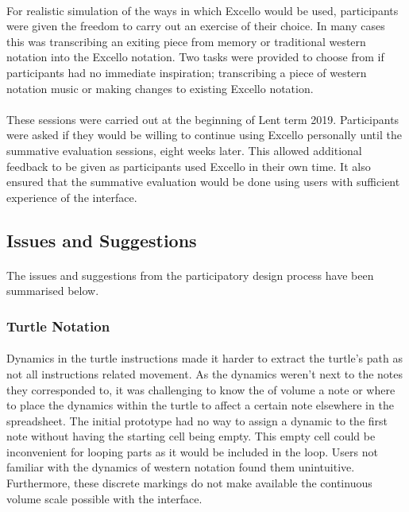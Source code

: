 \paragraph{} For realistic simulation of the ways in which Excello would be used, participants were given the freedom to carry out an exercise of their choice. In many cases this was transcribing an exiting piece from memory or traditional western notation into the Excello notation. Two tasks were provided to choose from if participants had no immediate inspiration; transcribing a piece of western notation music or making changes to existing Excello notation.

\paragraph{} These sessions were carried out at the beginning of Lent term 2019. Participants were asked if they would be willing to continue using Excello personally until the summative evaluation sessions, eight weeks later. This allowed additional feedback to be given as participants used Excello in their own time. It also ensured that the summative evaluation would be done using users with sufficient experience of the interface.

\subsection{Issues and Suggestions}

\paragraph{} The issues and suggestions from the participatory design process have been summarised below.

\subsubsection{Turtle Notation}

\paragraph{} Dynamics in the turtle instructions made it harder to extract the turtle's path as not all instructions related movement. As the dynamics weren't next to the notes they corresponded to, it was challenging to know the of volume a note or where to place the dynamics within the turtle to affect a certain note elsewhere in the spreadsheet. The initial prototype had no way to assign a dynamic to the first note without having the starting cell being empty. This empty cell could be inconvenient for looping parts as it would be included in the loop. Users not familiar with the dynamics of western notation found them unintuitive. Furthermore, these discrete markings do not make available the continuous volume scale possible with the interface.


